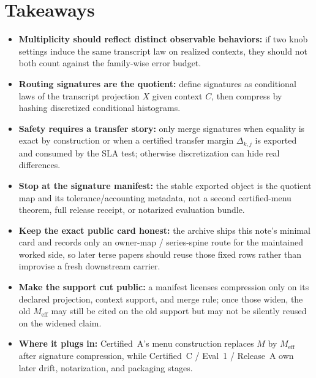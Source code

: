 \documentclass[11pt]{article}
\begin{document}
\section{Takeaways}
\begin{itemize}[leftmargin=*]
\item \textbf{Multiplicity should reflect distinct observable behaviors:} if two knob settings induce the same transcript law on realized contexts, they should not both count against the family-wise error budget.
\item \textbf{Routing signatures are the quotient:} define signatures as conditional laws of the transcript projection $X$ given context $C$, then compress by hashing discretized conditional histograms.
\item \textbf{Safety requires a transfer story:} only merge signatures when equality is exact by construction or when a certified transfer margin $\Delta_{k,j}$ is exported and consumed by the SLA test; otherwise discretization can hide real differences.
\item \textbf{Stop at the signature manifest:} the stable exported object is the quotient map and its tolerance/accounting metadata, not a second certified-menu theorem, full release receipt, or notarized evaluation bundle.
\item \textbf{Keep the exact public card honest:} the archive ships this note's minimal card and records only an owner-map / series-spine route for the maintained worked side, so later terse papers should reuse those fixed rows rather than improvise a fresh downstream carrier.
\item \textbf{Make the support cut public:} a manifest licenses compression only on its declared projection, context support, and merge rule; once those widen, the old $M_{\mathrm{eff}}$ may still be cited on the old support but may not be silently reused on the widened claim.
\item \textbf{Where it plugs in:} Certified~A's menu construction replaces $M$ by $M_{\mathrm{eff}}$ after signature compression, while Certified~C / Eval~1 / Release~A own later drift, notarization, and packaging stages.
\end{itemize}
\end{document}
